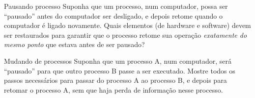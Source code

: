 \documentclass{beamer}
\begin{document}
\begin{frame}{Pausando processo}
  \large
Suponha que um processo, num computador, possa ser
  ``pausado'' antes do computador ser desligado, e
  depois retome quando o computador é ligado novamente. Quais elementos (de
  hardware e software) devem ser restaurados para garantir que o processo
  retome sua operação \textit{exatamente do mesmo ponto} que estava antes de ser
  pausado?
\end{frame}

\begin{frame}{Mudando de processos}
  \large
  Suponha que um processo A, num computador, será ``pausado'' para que outro
  processo B passe a ser executado. Mostre todos os passos necessários para
  passar do processo A ao processo B, e depois para retomar o processo A, sem
  que haja perda de informação nesse processo.
\end{frame}
\end{document}
